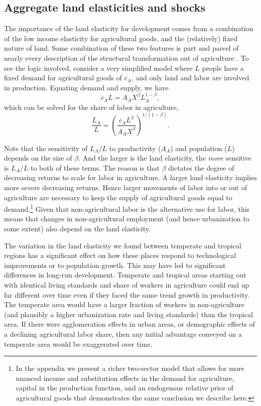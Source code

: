 \documentclass[11pt]{article}
\begin{document}
\subsection{Aggregate land elasticities and shocks}
The importance of the land elasticity for development comes from a combination of the low income elasticity for agricultural goods, and the (relatively) fixed nature of land. Some combination of these two features is part and parcel of nearly every description of the structural transformation out of agriculture \citep{kp2001,Gollin:2007oq,Restuccia:2008hc,Gollin:2010ys,vollrath2011,Alvarez-Cuadrado:2011nx,hrv2014,duarte2010role}. To see the logic involved, consider a very simplified model where $L$ people have a fixed demand for agricultural goods of $\overline{c}_A$, and only land and labor are involved in production. Equating demand and supply, we have
\begin{equation}
	\overline{c}_A L = A_A X^{\beta} L_A^{1-\beta},
\end{equation}
which can be solved for the share of labor in agriculture,
\begin{equation}
	\frac{L_A}{L} = \left(\frac{\overline{c}_A L^{\beta}}{A_A X^{\beta}}\right)^{1/(1-\beta)}.
\end{equation}

Note that the sensitivity of $L_A/L$ to productivity ($A_A$) and population ($L$) depends on the size of $\beta$. And the larger is the land elasticity, the \textit{more} sensitive is $L_A/L$ to both of these terms. The reason is that $\beta$ dictates the degree of decreasing returns to scale for labor in agriculture. A larger land elasticity implies more severe decreasing returns. Hence larger movements of labor into or out of agriculture are necessary to keep the supply of agricultural goods equal to demand.\footnote{In the appendix we present a richer two-sector model that allows for more nuanced income and substitution effects in the demand for agriculture, capital in the production function, and an endogenous relative price of agricultural goods that demonstrates the same conclusion we describe here.} Given that non-agricultural labor is the alternative use for labor, this means that changes in non-agricultural employment (and hence urbanization to some extent) also depend on the land elasticity. 

The variation in the land elasticity we found between temperate and tropical regions has a significant effect on how these places respond to technological improvements or to population growth. This may have led to significant differences in long-run development. Temperate and tropical areas starting out with identical living standards and share of workers in agriculture could end up far different over time even if they faced the same trend growth in productivity. The temperate area would have a larger fraction of workers in non-agriculture (and plausibly a higher urbanization rate and living standards) than the tropical area. If there were agglomeration effects in urban areas, or demographic effects of a declining agricultural labor share, then any initial advantage conveyed on a temperate area would be exaggerated over time.
\end{document}
